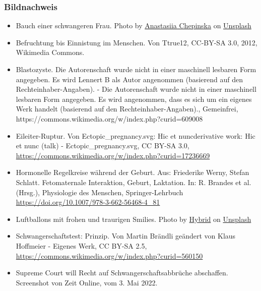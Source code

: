 \documentclass{beamer}
\begin{document}
\begin{frame}
\frametitle{Bildnachweis}

\begin{tiny}
 
\begin{itemize}


\item
Bauch einer schwangeren Frau. Photo by \href{https://unsplash.com/es/@anastasiiachepinska?utm_source=unsplash&utm_medium=referral&utm_content=creditCopyText}{Anastasiia Chepinska} on \href{https://unsplash.com/s/photos/pregnancy?utm_source=unsplash&utm_medium=referral&utm_content=creditCopyText}{Unsplash}


\item
Befruchtung bis Einnistung im Menschen. Von Ttrue12, CC-BY-SA 3.0, 2012, Wikimedia Commons. 

\item
Blastozyste. Die Autorenschaft wurde nicht in einer maschinell lesbaren Form angegeben. Es wird Lennert B als Autor angenommen (basierend auf den Rechteinhaber-Angaben). - Die Autorenschaft wurde nicht in einer maschinell lesbaren Form angegeben. Es wird angenommen, dass es sich um ein eigenes Werk handelt (basierend auf den Rechteinhaber-Angaben)., Gemeinfrei, https://commons.wikimedia.org/w/index.php?curid=609008

\item
Eileiter-Ruptur. Von Ectopic\_pregnancy.svg: Hic et nuncderivative work: Hic et nunc (talk) - Ectopic\_pregnancy.svg, CC BY-SA 3.0, \url{https://commons.wikimedia.org/w/index.php?curid=17236669}

\item
Hormonelle Regelkreise während der Geburt. Aus: Friederike Werny, Stefan Schlatt. Fetomaternale Interaktion, Geburt, Laktation. In: R. Brandes et al. (Hrsg.), Physiologie des Menschen, Springer-Lehrbuch \url{https://doi.org/10.1007/978-3-662-56468-4_81}


\item
Luftballons mit frohen und traurigen Smilies. Photo by \href{https://unsplash.com/@artbyhybrid?utm_source=unsplash&utm_medium=referral&utm_content=creditCopyText}{Hybrid} on \href{https://unsplash.com/s/photos/feedback?utm_source=unsplash&utm_medium=referral&utm_content=creditCopyText}{Unsplash}

\item
Schwangerschaftstest: Prinzip. Von Martin Brändli geändert von Klaus Hoffmeier - Eigenes Werk, CC BY-SA 2.5, \url{https://commons.wikimedia.org/w/index.php?curid=560150}




\item
Supreme Court will Recht auf Schwangerschaftsabbrüche abschaffen. Screenshot von Zeit Online, vom 3. Mai 2022.
\end{itemize}
\end{tiny}
\end{frame}
\end{document}
